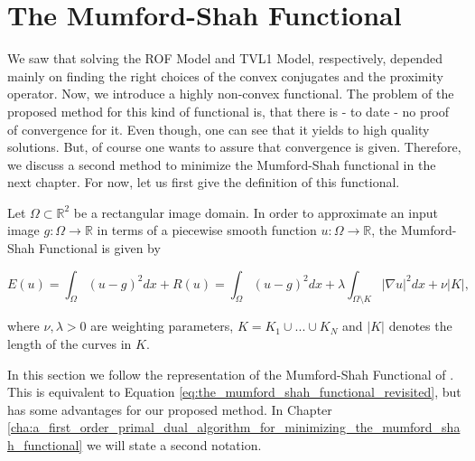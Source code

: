 \section{The Mumford-Shah Functional} %
\label{sec:the_mumford_shah_functional}
    
    We saw that solving the ROF Model and TVL1 Model, respectively, depended mainly on finding the right choices of the convex conjugates and the proximity operator. Now, we introduce a highly non-convex functional. The problem of the proposed method for this kind of functional is, that there is - to date - no proof of convergence for it. Even though, one can see that it yields to high quality solutions. But, of course one wants to assure that convergence is given. Therefore, we discuss a second method to minimize the Mumford-Shah functional in the next chapter. For now, let us first give the definition of this functional.

    \begin{definition} %
    \label{def:the_mumford_shah_functional}

        Let $\Omega \subset \mathbb{R}^{2}$ be a rectangular image domain. In order to approximate an input image $g: \Omega \longrightarrow \mathbb{R}$ in terms of a piecewise smooth function $u: \Omega \longrightarrow \mathbb{R}$, the Mumford-Shah Functional is given by
                
                \begin{equation}
                    E(u) = \int_{\Omega} (u - g)^{2} dx + R(u) = \int_{\Omega} (u - g)^{2} dx + \lambda \int_{\Omega \setminus K} |\nabla u|^{2} dx + \nu |K|,
                \end{equation}
                \label{eq:the_mumford_shah_functional}
            
            where $\nu, \lambda > 0$ are weighting parameters, $K = K_{1} \cup ... \cup K_{N}$ and $|K|$ denotes the length of the curves in $K$.

    \end{definition}

    \begin{remark}
        In this section we follow the representation of the Mumford-Shah Functional of \cite{Strekalovskiy-Cremers-eccv14}. This is equivalent to Equation \ref{eq:the_mumford_shah_functional_revisited}, but has some advantages for our proposed method. In Chapter \ref{cha:a_first_order_primal_dual_algorithm_for_minimizing_the_mumford_shah_functional} we will state a second notation.
    \end{remark}

